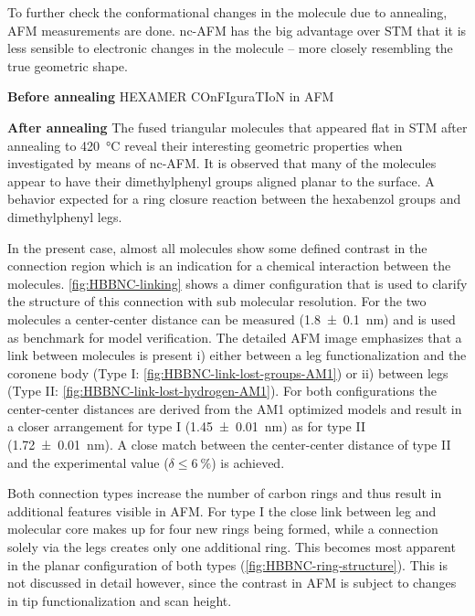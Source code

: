 To further check the conformational changes in the molecule due to annealing, AFM measurements are done. nc-AFM has the big advantage over STM that it is less sensible to electronic changes in the molecule – more closely resembling the true geometric shape.

\textbf{Before annealing} 
HEXAMER COnFIguraTIoN in AFM

\textbf{After annealing}
The fused triangular molecules that appeared flat in STM after annealing to \SI{420}{\celsius} reveal their interesting geometric properties when investigated by means of nc-AFM. It is observed that many of the molecules appear to have their dimethylphenyl groups aligned planar to the surface. A behavior expected for a ring closure reaction between the hexabenzol groups and dimethylphenyl legs.

In the present case, almost all molecules show some defined contrast in the connection region which is an indication for a chemical interaction between the molecules.
\autoref{fig:HBBNC-linking} shows a dimer configuration that is used to clarify the structure of this connection with sub molecular resolution. For the two molecules a center-center distance can be measured (\SI{1.8 \pm 0.1}{\nano \meter}) and is used as benchmark for model verification. The detailed AFM image emphasizes that a link between molecules is present i) either between a leg functionalization and the coronene body (Type I: \autoref{fig:HBBNC-link-lost-groups-AM1}) or ii) between legs (Type II: \autoref{fig:HBBNC-link-lost-hydrogen-AM1}). For both configurations the center-center distances are derived from the AM1 optimized models and result in a closer arrangement for type I (\SI{1.45 \pm 0.01}{\nano \meter}) as for type II (\SI{1.72 \pm 0.01}{\nano \meter}). A close match between the center-center distance of type II and the experimental value ($\delta \leq \SI{6}{\percent}$) is achieved.

Both connection types increase the number of carbon rings and thus result in additional features visible in AFM. For type I the close link between leg and molecular core makes up for four new rings being formed, while a connection solely via the legs creates only one additional ring. This becomes most apparent in the planar configuration of both types (\autoref{fig:HBBNC-ring-structure}). This is not discussed in detail however, since the contrast in AFM is subject to changes in tip functionalization and scan height.

